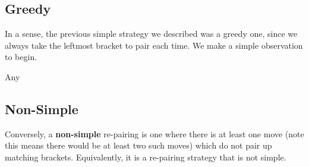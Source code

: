 \subsection{Greedy}
In a sense, the previous simple strategy we described was a greedy one, since we always take the leftmost bracket to pair each time. We make a simple observation to begin.
\begin{observation}
    Any 
\end{observation}

\subsection{Non-Simple}
Conversely, a \textbf{non-simple} re-pairing is one where there is at least one move (note this means there would be at least two such moves) which do not pair up matching brackets. Equivalently, it is a re-pairing strategy that is not simple.
